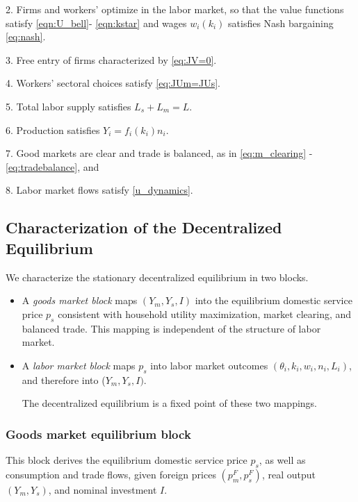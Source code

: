 \documentclass[12pt]{article} %
\theoremstyle{definition}
\begin{document}
2. Firms and workers' optimize  in  the labor market, so that the value functions satisfy \eqref{eqn:U_bell}- \eqref{eqn:kstar} and wages $w_i(k_i)$ satisfies Nash bargaining \eqref{eq:nash}.

3. Free entry of firms characterized  by \eqref{eq:JV=0}.

4. Workers' sectoral choices satisfy  \eqref{eq:JUm=JUs}. 

5. Total labor supply satisfies $L_s+L_m = L$.

6. Production  satisfies $Y_i = f_i(k_i)n_i$.  


7. Good markets are clear and trade is balanced, as in \eqref{eq:m_clearing} - \eqref{eq:tradebalance}, and 

8. Labor market flows satisfy \eqref{u_dynamics}.
 

\subsection{Characterization of the Decentralized Equilibrium}

We characterize the stationary decentralized equilibrium in two blocks. 
\begin{itemize}
    \item A \textit{goods market block} maps $(Y_m, Y_s, I)$ into the equilibrium domestic service price $p_s$ consistent with household utility maximization, market clearing, and balanced trade. This mapping is independent of the structure of labor market.  

    \item A \textit{labor market block} maps $p_s$ into labor market outcomes $(\theta_i, k_i, w_i, n_i, L_i)$, and therefore into ($ Y_m, Y_s, I)$. 
    
    The decentralized equilibrium is a fixed point of these two mappings. 

\end{itemize}





\subsubsection{Goods market equilibrium block}
This block derives the equilibrium domestic service price $p_s$, as well as consumption and trade flows, given foreign prices  $(p_m^F, p_s^F)$, real output  $(Y_m, Y_s)$, and nominal investment $I$.
\end{document}
